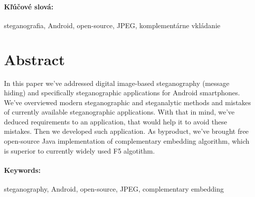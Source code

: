 \documentclass[12pt, oneside]{book}
\begin{document}
\paragraph*{Kľúčové slová:} steganografia, Android, open-source, JPEG, komplementárne vkládanie 


\newpage 
\section*{Abstract}

In this paper we've addressed digital image-based steganography (message hiding) and 
specifically steganographic applications for Android smartphones. We've overviewed modern
steganographic and steganalytic methods and mistakes of currently available steganographic
applications. With that in mind, we've deduced requirements to an application, that would
help it to avoid these mistakes. Then we developed such application. As byproduct, we've
brought free open-source Java implementation of complementary embedding algorithm, which
is superior to currently widely used F5 algotithm.


\paragraph*{Keywords:} steganography, Android, open-source, JPEG, complementary embedding



\newpage 

\tableofcontents



\newpage 

\listoffigures


\mainmatter





\end{document}
